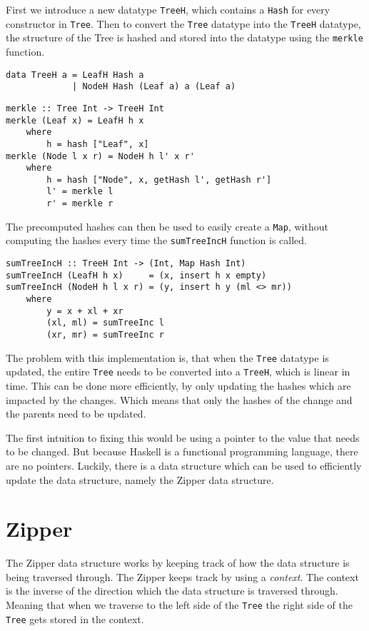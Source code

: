 First we introduce a new datatype \texttt{TreeH}, which contains a \texttt{Hash} for every constructor in \texttt{Tree}. Then to convert the \texttt{Tree} datatype into the \texttt{TreeH} datatype, the structure of the Tree is hashed and stored into the datatype using the \texttt{merkle} function.

\begin{verbatim}
data TreeH a = LeafH Hash a
             | NodeH Hash (Leaf a) a (Leaf a)
\end{verbatim}

\begin{verbatim}
merkle :: Tree Int -> TreeH Int
merkle (Leaf x) = LeafH h x
    where
        h = hash ["Leaf", x]
merkle (Node l x r) = NodeH h l' x r'
    where
        h = hash ["Node", x, getHash l', getHash r']
        l' = merkle l
        r' = merkle r
\end{verbatim}

The precomputed hashes can then be used to easily create a \texttt{Map}, without computing the hashes every time the \texttt{sumTreeIncH} function is called.

\begin{verbatim}
sumTreeIncH :: TreeH Int -> (Int, Map Hash Int)
sumTreeIncH (LeafH h x)     = (x, insert h x empty)
sumTreeIncH (NodeH h l x r) = (y, insert h y (ml <> mr))
    where
        y = x + xl + xr
        (xl, ml) = sumTreeInc l
        (xr, mr) = sumTreeInc r
\end{verbatim}

The problem with this implementation is, that when the \texttt{Tree} datatype is updated, the entire \texttt{Tree} needs to be converted into a \texttt{TreeH}, which is linear in time. This can be done more efficiently, by only updating the hashes which are impacted by the changes. Which means that only the hashes of the change and the parents need to be updated. 

The first intuition to fixing this would be using a pointer to the value that needs to be changed. But because Haskell is a functional programming language, there are no pointers. Luckily, there is a data structure which can be used to efficiently update the data structure, namely the Zipper\cite{huet1997zipper} data structure.

\newpage
\section{Zipper}

The Zipper data structure works by keeping track of how the data structure is being traversed through. The Zipper keeps track by using a \textit{context}. The context is the inverse of the direction which the data structure is traversed through. Meaning that when we traverse to the left side of the \texttt{Tree} the right side of the \texttt{Tree} gets stored in the context. 

